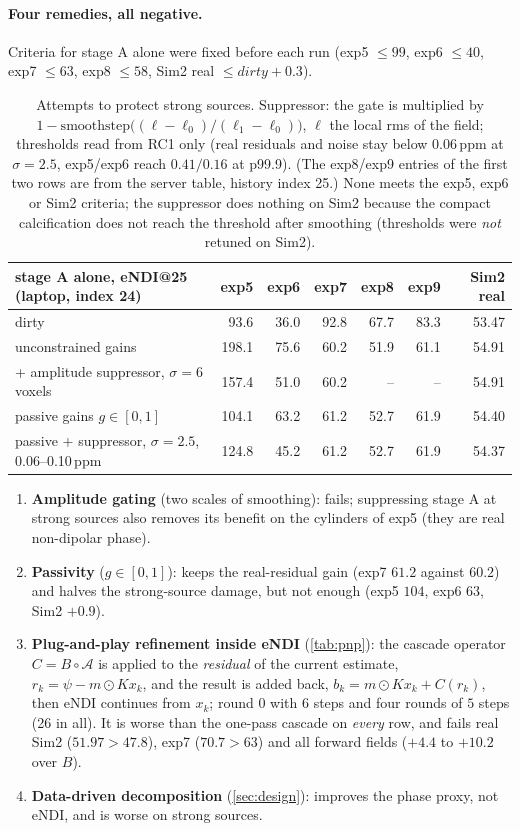 \documentclass[11pt]{article}
\begin{document}
\paragraph{Four remedies, all negative.}
Criteria for stage A alone were fixed before each run (exp5 $\le99$, exp6 $\le40$, exp7 $\le63$, exp8 $\le58$, Sim2 real $\le dirty+0.3$).
\begin{table}[h]\centering\small
\begin{tabular}{@{}lrrrrrr@{}}
\toprule
stage A alone, eNDI@25 (laptop, index 24) & exp5 & exp6 & exp7 & exp8 & exp9 & Sim2 real \\
\midrule
dirty & 93.6 & 36.0 & 92.8 & 67.7 & 83.3 & 53.47 \\
unconstrained gains & 198.1 & 75.6 & 60.2 & 51.9 & 61.1 & 54.91 \\
+ amplitude suppressor, $\sigma=6$ voxels & 157.4 & 51.0 & 60.2 & -- & -- & 54.91 \\
passive gains $g\in[0,1]$ & 104.1 & 63.2 & 61.2 & 52.7 & 61.9 & 54.40 \\
passive + suppressor, $\sigma=2.5$, 0.06--0.10\,ppm & 124.8 & 45.2 & 61.2 & 52.7 & 61.9 & 54.37 \\
\bottomrule
\end{tabular}
\caption{Attempts to protect strong sources. Suppressor: the gate is multiplied by $1-\mathrm{smoothstep}\big((\ell-\ell_0)/(\ell_1-\ell_0)\big)$, $\ell$ the local rms of the field; thresholds read from RC1 only (real residuals and noise stay below $0.06$\,ppm at $\sigma=2.5$, exp5/exp6 reach $0.41/0.16$ at p99.9). (The exp8/exp9 entries of the first two rows are from the server table, history index 25.) None meets the exp5, exp6 or Sim2 criteria; the suppressor does nothing on Sim2 because the compact calcification does not reach the threshold after smoothing (thresholds were \emph{not} retuned on Sim2).}\label{tab:strong}
\end{table}
\begin{enumerate}[leftmargin=1.5em,itemsep=1pt]
\item \textbf{Amplitude gating} (two scales of smoothing): fails; suppressing stage A at strong sources also removes its benefit on the cylinders of exp5 (they are real non-dipolar phase).
\item \textbf{Passivity} ($g\in[0,1]$): keeps the real-residual gain (exp7 $61.2$ against $60.2$) and halves the strong-source damage, but not enough (exp5 $104$, exp6 $63$, Sim2 $+0.9$).
\item \textbf{Plug-and-play refinement inside eNDI} (\cref{tab:pnp}): the cascade operator $C=B\circ\mathcal A$ is applied to the \emph{residual} of the current estimate, $r_k=\psi-m\odot K x_{k}$, and the result is added back, $b_k=m\odot Kx_k+C(r_k)$, then eNDI continues from $x_k$; round $0$ with $6$ steps and four rounds of $5$ steps (26 in all). It is worse than the one-pass cascade on \emph{every} row, and fails real Sim2 ($51.97>47.8$), exp7 ($70.7>63$) and all forward fields ($+4.4$ to $+10.2$ over $B$).
\item \textbf{Data-driven decomposition} (\cref{sec:design}): improves the phase proxy, not eNDI, and is worse on strong sources.
\end{enumerate}
\end{document}
